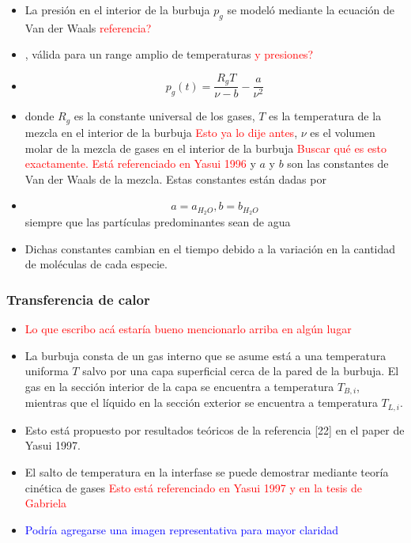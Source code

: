 \documentclass[aps,prb,twocolumn,superscriptaddress,floatfix,longbibliography,10pt]{revtex4-2}
\newif\ifptitle
\newif\ifpnumber
\newcounter{para}
\newcommand\ptitle[1]{\par\refstepcounter{para}
{\ifpnumber{\noindent\textcolor{lightgray}{\textbf{\thepara}}\indent}\fi}
{\ifptitle{\textbf{[{#1}]}}\fi}}
\begin{document}
\ptitle{Definición de la presión en el interior de la burbuja $p_g$. Ec de estado de Van der Waals.}
\begin{itemize}
  \item La presión en el interior de la burbuja $p_g$ se modeló mediante la ecuación de Van der Waals \textcolor{red}{referencia?}
  \item , válida para un range amplio de temperaturas \textcolor{red}{y presiones?}
  \item \[p_g(t) = \frac{R_g T}{\nu - b} - \frac{a}{\nu^2}\]
  \item donde $R_g$ es la constante universal de los gases, $T$ es la temperatura de la mezcla en el interior de la burbuja \textcolor{red}{Esto ya lo dije antes}, $\nu$ es el volumen molar de la mezcla de gases en el interior de la burbuja \textcolor{red}{Buscar qué es esto exactamente. Está referenciado en Yasui 1996} y $a$ y $b$ son las constantes de Van der Waals de la mezcla. Estas constantes están dadas por
  \item \[a = a_{H_2O}, b = b_{H_2O} \]
  siempre que las partículas predominantes sean de agua
  \item Dichas constantes cambian en el tiempo debido a la variación en la cantidad de moléculas de cada especie.
\end{itemize}


\subsubsection{Transferencia de calor}

\ptitle{Descripción física del problema}
\begin{itemize}
  \item \textcolor{red}{Lo que escribo acá estaría bueno mencionarlo arriba en algún lugar}
  \item La burbuja consta de un gas interno que se asume está a una temperatura uniforma $T$ salvo por una capa superficial cerca de la pared de la burbuja. El gas en la sección interior de la capa se encuentra a temperatura $T_{B,i}$, mientras que el líquido en la sección exterior se encuentra a temperatura $T_{L,i}$.
  \item Esto está propuesto por resultados teóricos de la referencia [22] en el paper de Yasui 1997.
  \item El salto de temperatura en la interfase se puede demostrar mediante teoría cinética de gases \textcolor{red}{Esto está referenciado en Yasui 1997 y en la tesis de Gabriela}
  \item \textcolor{blue}{Podría agregarse una imagen representativa para mayor claridad}
\end{itemize}
\end{document}
